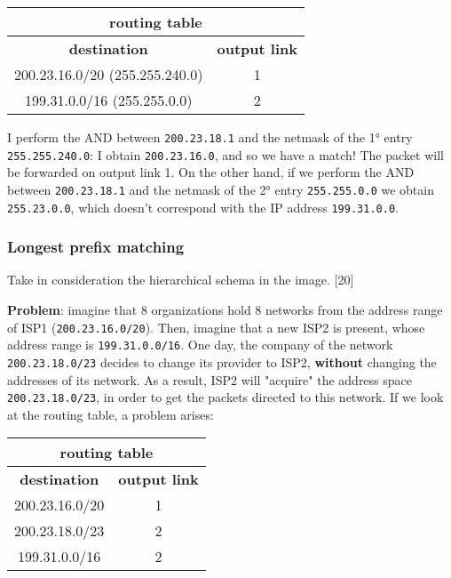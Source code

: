\begin{table}[!h]
    \centering
    \begin{tabular}{|cc|}
    \hline
    \multicolumn{2}{|c|}{\textbf{routing table}} \\ \hline
    \multicolumn{1}{|c|}{\textbf{destination}} & \textbf{output link} \\ \hline
    \multicolumn{1}{|c|}{200.23.16.0/20 (255.255.240.0)} & 1 \\ \hline
    \multicolumn{1}{|c|}{199.31.0.0/16 (255.255.0.0)} & 2 \\ \hline
    \end{tabular}
\end{table}

I perform the AND between \texttt{200.23.18.1} and the netmask of the 1° entry \texttt{255.255.240.0}: I obtain \texttt{200.23.16.0}, and so we have a match! The packet will be forwarded on output link 1. On the other hand, if we perform the AND between \texttt{200.23.18.1} and the netmask of the 2° entry \texttt{255.255.0.0} we obtain \texttt{255.23.0.0}, which doesn't correspond with the IP address \texttt{199.31.0.0}.

\subsubsection{Longest prefix matching}
Take in consideration the hierarchical schema in the image. [20]

\textbf{Problem}: imagine that 8 organizations hold 8 networks from the address range of ISP1 (\texttt{200.23.16.0/20}). Then, imagine that a new ISP2 is present, whose address range is \texttt{199.31.0.0/16}. One day, the company of the network \texttt{200.23.18.0/23} decides to change its provider to ISP2, \textbf{without} changing the addresses of its network. As a result, ISP2 will "acquire" the address space \texttt{200.23.18.0/23}, in order to get the packets directed to this network. If we look at the routing table, a problem arises:
\begin{table}[!h]
    \centering
    \begin{tabular}{|cc|}
    \hline
    \multicolumn{2}{|c|}{\textbf{routing table}} \\ \hline
    \multicolumn{1}{|c|}{\textbf{destination}} & \textbf{output link} \\ \hline
    \multicolumn{1}{|c|}{200.23.16.0/20} & 1 \\ \hline
    \multicolumn{1}{|c|}{200.23.18.0/23} & 2 \\ \hline
    \multicolumn{1}{|c|}{199.31.0.0/16} & 2 \\ \hline
    \end{tabular}
\end{table}

